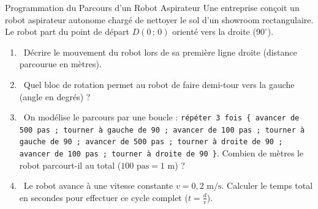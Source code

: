 \begin{sujetdnb}{Programmation du Parcours d'un Robot Aspirateur}
Une entreprise conçoit un robot aspirateur autonome chargé de nettoyer le sol d'un showroom rectangulaire.
Le robot part du point de départ $D(0\,;\,0)$ orienté vers la droite ($90^\circ$).

\begin{center}
\end{center}

\begin{enumerate}[leftmargin=1.5em, itemsep=3pt]
    \item \capSApproprier\ Décrire le mouvement du robot lors de sa première ligne droite (distance parcourue en mètres).
    \item \capRealiser\ Quel bloc de rotation permet au robot de faire demi-tour vers la gauche (angle en degrés) ?
    \item \capAnalyser\ On modélise le parcours par une boucle : \texttt{répéter 3 fois \{ avancer de 500 pas ; tourner à gauche de 90 ; avancer de 100 pas ; tourner à gauche de 90 ; avancer de 500 pas ; tourner à droite de 90 ; avancer de 100 pas ; tourner à droite de 90 \}}. Combien de mètres le robot parcourt-il au total ($100\text{ pas} = 1\text{ m}$) ?
    \item \capValider\ Le robot avance à une vitesse constante $v = 0{,}2\text{ m/s}$. Calculer le temps total en secondes pour effectuer ce cycle complet ($t = \frac{d}{v}$).
\end{enumerate}

\vspace{3mm}
\lignesreponse[8]
\end{sujetdnb}
